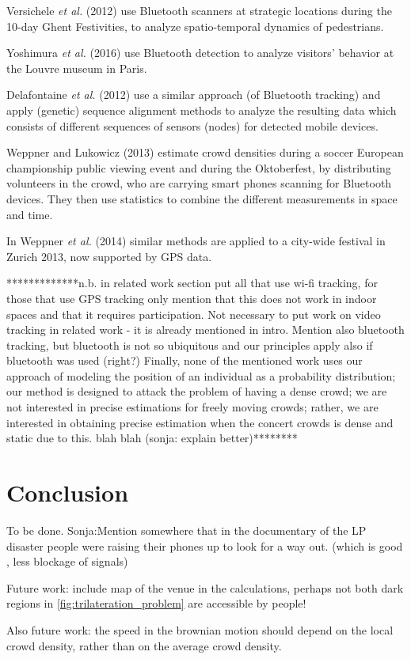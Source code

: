 \documentclass[10pt,a4paper]{article}
\begin{document}
Versichele \textit{et al.} (2012) \cite{versichele:1} use Bluetooth scanners at strategic locations during the 10-day Ghent Festivities, to analyze spatio-temporal dynamics of pedestrians. 

Yoshimura \textit{et al.} (2016) \cite{yoshimura:1} use Bluetooth detection to analyze visitors' behavior at the Louvre museum in Paris.

Delafontaine \textit{et al.} (2012) \cite{delafontaine:1} use a similar approach (of Bluetooth tracking) and apply (genetic) sequence alignment methods to analyze the resulting data which consists of different sequences of sensors (nodes) for detected mobile devices.

Weppner and Lukowicz (2013) \cite{weppner:1} estimate crowd densities during a soccer European championship public viewing event and during the Oktoberfest, by distributing volunteers in the crowd, who are carrying smart phones scanning for Bluetooth devices. They then use statistics to combine the different measurements in space and time.

In Weppner \textit{et al.} (2014) \cite{weppner:2} similar methods are applied to a city-wide festival in Zurich 2013, now supported by GPS data.

*************n.b. in related work section put all that use wi-fi tracking, for those that use GPS tracking only mention that this does not work in indoor spaces and that it requires participation. Not necessary to put work on video tracking in related work - it is already mentioned in intro. Mention also bluetooth tracking, but bluetooth is not so ubiquitous and our principles apply also if bluetooth was used (right?) Finally, none of the mentioned work uses our approach of modeling the position of an individual as a probability distribution; our method is designed to attack the problem of having a dense crowd; we are not interested in precise estimations for freely moving crowds; rather, we are interested in obtaining precise estimation when the  concert crowds is dense and static due to this. blah blah (sonja: explain better)********


\section{Conclusion}\label{sec:conclusion}
To be done. 
Sonja:Mention somewhere that in the documentary of the LP disaster people were raising their phones up to look for a way out. (which is good , less blockage of signals)




Future work: include map of the venue in the calculations, perhaps not both dark  regions in \ref{fig:trilateration_problem} are accessible by people!

Also future work: the speed in the brownian motion should depend on the local crowd density, rather than on the average crowd density.



\end{document}
